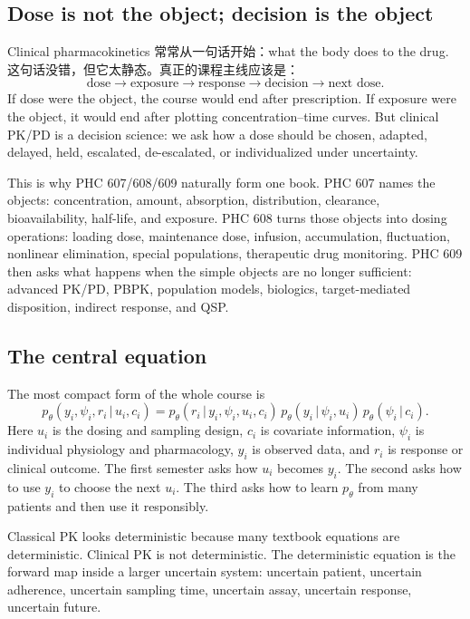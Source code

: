 \documentclass[a4paper]{article}
\newcommand{\given}{\,|\,}
\begin{document}
\subsection{Dose is not the object; decision is the object}

Clinical pharmacokinetics 常常从一句话开始：what the body does to the drug. 这句话没错，但它太静态。真正的课程主线应该是：
\[
  \text{dose}
  \longrightarrow
  \text{exposure}
  \longrightarrow
  \text{response}
  \longrightarrow
  \text{decision}
  \longrightarrow
  \text{next dose}.
\]
If dose were the object, the course would end after prescription. If exposure were the object, it would end after plotting concentration--time curves. But clinical PK/PD is a decision science: we ask how a dose should be chosen, adapted, delayed, held, escalated, de-escalated, or individualized under uncertainty.

This is why PHC 607/608/609 naturally form one book. PHC 607 names the objects: concentration, amount, absorption, distribution, clearance, bioavailability, half-life, and exposure. PHC 608 turns those objects into dosing operations: loading dose, maintenance dose, infusion, accumulation, fluctuation, nonlinear elimination, special populations, therapeutic drug monitoring. PHC 609 then asks what happens when the simple objects are no longer sufficient: advanced PK/PD, PBPK, population models, biologics, target-mediated disposition, indirect response, and QSP.

\subsection{The central equation}

The most compact form of the whole course is
\[
  p_\theta(y_i,\psi_i,r_i\given u_i,c_i)
  =
  p_\theta(r_i\given y_i,\psi_i,u_i,c_i)\,
  p_\theta(y_i\given \psi_i,u_i)\,
  p_\theta(\psi_i\given c_i).
\]
Here \(u_i\) is the dosing and sampling design, \(c_i\) is covariate information, \(\psi_i\) is individual physiology and pharmacology, \(y_i\) is observed data, and \(r_i\) is response or clinical outcome.  The first semester asks how \(u_i\) becomes \(y_i\).  The second asks how to use \(y_i\) to choose the next \(u_i\).  The third asks how to learn \(p_\theta\) from many patients and then use it responsibly.

\figureDecisionLoop

\begin{remark}
  Classical PK looks deterministic because many textbook equations are deterministic. Clinical PK is not deterministic. The deterministic equation is the forward map inside a larger uncertain system: uncertain patient, uncertain adherence, uncertain sampling time, uncertain assay, uncertain response, uncertain future.
\end{remark}
\end{document}
